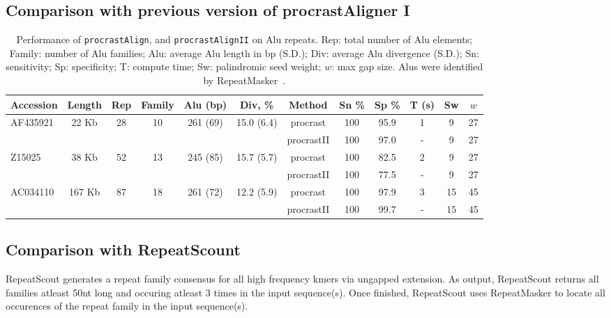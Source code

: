\documentclass{llncs}
\begin{document}
\subsection{Comparison with previous version of procrastAligner I}
\begin{table}[t]
  \centering
\begin{tabular}{lccccccccccc}
\hline Accession & Length & Rep & Family & Alu (bp) & Div, \% & Method & Sn \% & Sp \% & T (s) & Sw & $w$ \\
\hline
\hline AF435921 &  22 Kb &  28 & 10 & 261 (69) & 15.0 (6.4) & procrast & 100 & 95.9 & 1 & 9 & 27 \\
\cline{7-12}                                            &&&&&& procrastII & 100 & 97.0 & - & 9 & 27 \\
\hline Z15025 &    38 Kb &  52 & 13 & 245 (85) & 15.7 (5.7) & procrast & 100 & 82.5 & 2 & 9 & 27 \\
\cline{7-12}                                            &&&&&& procrastII & 100 & 77.5 & - & 9 & 27 \\
\hline AC034110 & 167 Kb &  87 & 18 & 261 (72) & 12.2 (5.9) & procrast & 100 & 97.9 & 3 & 15 & 45\\
\cline{7-12}                                            &&&&&& procrastII & 100 & 99.7 &- & 15 & 45 \\



\end{tabular}
\vspace{0.1cm}
  \caption{Performance of \texttt{procrastAlign}, and  \texttt{procrastAlignII} on Alu repeats.
  Rep: total number of Alu elements; Family: number of Alu
  families; Alu: average Alu length in bp (S.D.); Div: average Alu divergence (S.D.);
   Sn: sensitivity; Sp: specificity; T: compute time; Sw: palindromic seed weight; $w$: max gap size.  Alus were
  identified by RepeatMasker~\cite{ref-repbase}.}
  \label{table:alu}
\end{table}

 \subsection{Comparison with RepeatScount}

RepeatScout generates a repeat family consensus for all high frequency kmers via ungapped extension. As output, RepeatScout returns all families atleast 50nt long and occuring atleast 3 times in the input sequence(s). Once finished, RepeatScout uses RepeatMasker to locate all occurences of the repeat family in the input sequence(s).
\end{document}
